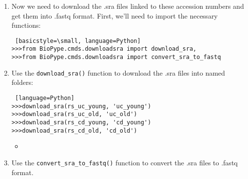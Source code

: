 \begin{enumerate}
\begin{lstlisting} [basicstyle=\footnotesize, language=Python]
>>>rs_uc_young = rt.RunTable.random_sample_subset(uc_young_nums, n=3)
>>>rs_uc_old = rt.RunTable.random_sample_subset(uc_old_nums, n=3)
>>>rs_cd_young = rt.RunTable.random_sample_subset(cd_young_nums, n=3)
>>>rs_cd_old = rt.RunTable.random_sample_subset(cd_old_nums, n=3)
            \end{lstlisting}
            
            
            \item Now we need to download the .sra files linked to these accession numbers and get them into .fastq format. First, we'll need to import the necessary functions:
            \begin{lstlisting} [basicstyle=\small, language=Python]
>>>from BioPype.cmds.downloadsra import download_sra,
>>>from BioPype.cmds.downloadsra import convert_sra_to_fastq
            \end{lstlisting}
            
            
            \item Use the \verb|download_sra()| function to download the .sra files into named folders:
            \begin{lstlisting} [language=Python]
>>>download_sra(rs_uc_young, 'uc_young')
>>>download_sra(rs_uc_old, 'uc_old')
>>>download_sra(rs_cd_young, 'cd_young')
>>>download_sra(rs_cd_old, 'cd_old')
            \end{lstlisting}
                \begin{itemize}
                \item {}
                \end{itemize}
            
            
            \item {} 
            Use the \verb|convert_sra_to_fastq()| function to convert the .sra files to .fastq format.
            

\end{enumerate}
